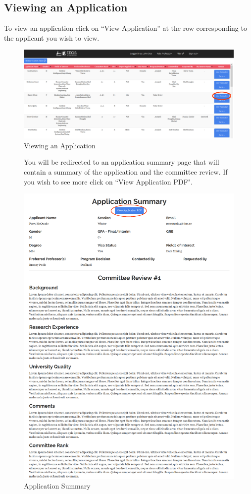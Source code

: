 \documentclass[fontsize=12pt,paper=letter,twoside]{scrartcl}
\begin{document}
\subsection{Viewing an Application}
To view an application click on ``View Application'' at the row corresponding to the applicant you wish to view.
\begin{figure}[!htb]
\begin{center}
\includegraphics[width=.99\textwidth]{images/view_app.png}
\end{center}
\caption{Viewing an Application}
\end{figure}
\begin{figure}[!htb]
You will be redirected to an application summary page that will contain a summary of the application and the committee review. If you wish to see more click on ``View Application PDF".
\begin{center}
\includegraphics[width=.99\textwidth]{images/viewapp.png}
\end{center}
\caption{Application Summary}
\label{fig:sorted_table}
\end{figure}
\clearpage
\end{document}
